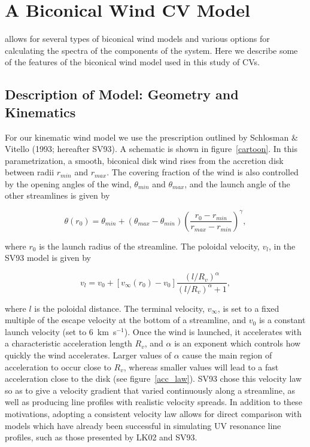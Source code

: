 \documentclass[preprint, a4paper, 11pt]{aastex}
\begin{document}
{\section{A Biconical Wind CV Model}

\py allows for several types of biconical wind models and various options for calculating the spectra of the components of the system. Here we describe some of the features of the  biconical wind model used in this study of CVs. 

\subsection{Description of Model: Geometry and Kinematics}

For our kinematic wind model we use 
the prescription outlined by Schlosman \& Vitello (1993; hereafter SV93). A schematic is shown
in figure~\ref{cartoon}. In this parametrization, a smooth, biconical
disk wind rises from the accretion disk between radii $r_{min}$ and $r_{max}$. The covering fraction of the wind is 
also controlled by the opening angles of the wind, $\theta_{min}$ and $\theta_{max}$, and the launch angle of
the other streamlines is given by

\begin{equation}
\theta(r_0) = \theta_{min} + (\theta_{max} - \theta_{min}) \left(\frac{r_0 - r_{min}}{r_{max} - r_{min}} \right)^{\gamma},
\label{theta}
\end{equation}

where $r_0$ is the launch radius of the streamline.
The poloidal velocity, $v_l$, in the SV93 model is given by

\begin{equation}
v_l=v_0+\left[v_{\infty}(r_0)-v_0\right]\frac{\left(l/R_v\right)^{\alpha}}{\left(l/R_v\right)^{\alpha}+1},
\label{v_law}
\end{equation}

where $l$ is the poloidal distance. The terminal velocity, 
$v_{\infty}$, is set to a fixed multiple of the escape velocity at the bottom
of a streamline, and $v_0$ is a constant launch velocity (set to $6$~km~s$^{-1}$).
Once the wind is launched, it accelerates with a characteristic acceleration
length $R_v$, and $\alpha$ is an exponent which controls how quickly the 
wind accelerates. Larger values of $\alpha$ cause the main region of 
acceleration to occur close to $R_v$, whereas smaller values will lead
to a fast acceleration close to the disk (see figure~\ref{acc_law}).
SV93 chose this velocity law so as to give a 
velocity gradient that varied continuously along a streamline, as well
as producing line profiles with realistic velocity spreads.
In addition to these motivations, adopting a consistent velocity law 
allows for direct comparison with models which have already been successful in 
simulating UV resonance line profiles, such as those presented by LK02 and SV93.  


}
\end{document}

